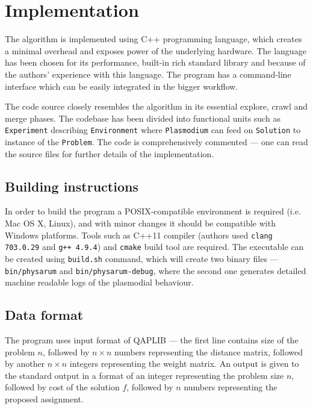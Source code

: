 \documentclass[english,a4paper,twoside]{ppfcmthesis}
\begin{document}
\section{Implementation}
\label{section:project_implementation}

The algorithm is implemented using C++ programming language, which creates a minimal overhead and exposes power of the underlying hardware. The language has been chosen for its performance, built-in rich standard library and because of the authors' experience with this language. The program has a command-line interface which can be easily integrated in the bigger workflow.

The code source closely resembles the algorithm in its essential explore, crawl and merge phases. The codebase has been divided into functional units such as \texttt{Experiment} describing \texttt{Environment} where \texttt{Plasmodium} can feed on \texttt{Solution} to instance of the \texttt{Problem}. The code is comprehensively commented --- one can read the source files for further details of the implementation.

\subsection{Building instructions}

In order to build the program a POSIX-compatible environment is required (i.e. Mac OS X, Linux), and with minor changes it should be compatible with Windows platforms. Tools such as C++11 compiler (authors used \texttt{clang 703.0.29} and \texttt{g++ 4.9.4}) and \texttt{cmake} build tool are required. The executable can be created using \texttt{build.sh} command, which will create two binary files --- \texttt{bin/physarum} and \texttt{bin/physarum-debug}, where the second one generates detailed machine readable logs of the plasmodial behaviour.

\subsection{Data format}

The program uses input format of QAPLIB \cite{burkard1997qaplib} --- the first line contains size of the problem $n$, followed by $n{\times}n$ numbers representing the distance matrix, followed by another $n{\times}n$ integers representing the weight matrix. An output is given to the standard output in a format of an integer representing the problem size $n$, followed by cost of the solution $f$, followed by $n$ numbers representing the proposed assignment.
\end{document}
